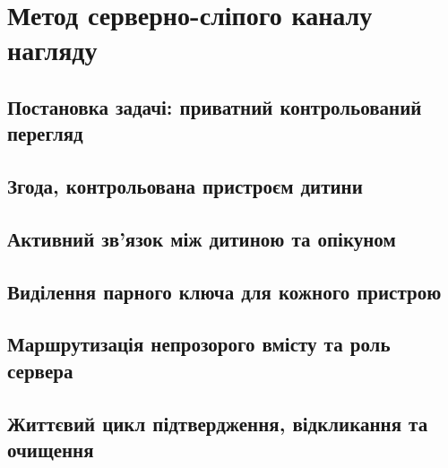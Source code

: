 \chapter{Метод серверно-сліпого каналу нагляду}
\label{ch:relay}


\section{Постановка задачі: приватний контрольований перегляд}
\label{sec:relay-problem}

\section{Згода, контрольована пристроєм дитини}
\label{sec:relay-consent}

\section{Активний зв'язок між дитиною та опікуном}
\label{sec:relay-binding}

\section{Виділення парного ключа для кожного пристрою}
\label{sec:relay-pairkey}

\section{Маршрутизація непрозорого вмісту та роль сервера}
\label{sec:relay-routing}

\section{Життєвий цикл підтвердження, відкликання та очищення}
\label{sec:relay-lifecycle}

